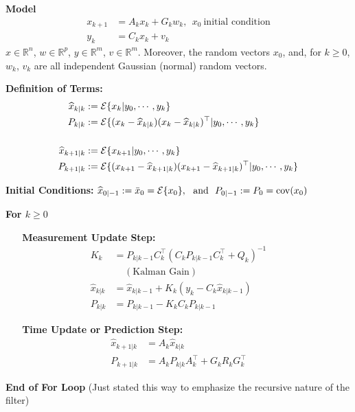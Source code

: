\documentclass[letterpaper]{article}
\newcommand{\real}{\mathbb R}  %
\newcommand{\cov}{\mathrm{cov}}
\newcommand{\Expectof}[1]{{\cal E} \{ #1 \}}
\newcommand{\ExpectofGiven}[2]{{\cal E} \{ #1 | #2 \}}
\begin{document}
\baselineskip=48pt  %


\setlength{\parskip}{.3in}
\setlength{\itemsep}{.3in}

\pagestyle{plain}



\Large

\noindent \textbf{Model}~
\begin{align*}
x_{k+1} &= A_k x_k + G_k w_k,~~x_0~\text{initial condition}\\
y_k &= C_k x_k + v_k
\end{align*}
$x\in \real^n$, $w \in \real^p$, $y\in \real^m$, $v\in \real^m$. Moreover, the random vectors
$x_0$, and, for $k\ge 0$,  $w_k$, $v_k$ are all independent Gaussian (normal) random vectors.


\textbf{Definition of Terms:}
\begin{align*}
\widehat{x}_{k|k} &:= \ExpectofGiven{x_k}{y_0, \cdots, y_k}\\
P_{k|k} &:=\ExpectofGiven{(x_k-\widehat{x}_{k|k})(x_k-\widehat{x}_{k|k})^\top}{y_0, \cdots, y_k}\\
& \\
\widehat{x}_{k+1|k} &:= \ExpectofGiven{ x_{k+1} }{ y_0, \cdots, y_k}\\
P_{k+1|k}&:= \ExpectofGiven{(x_{k+1}-\widehat{x}_{k+1|k})(x_{k+1}-\widehat{x}_{k+1|k})^\top}{y_0, \cdots, y_k}\\
\end{align*}
\vspace*{-1cm}

\textbf{Initial Conditions:} $\widehat{x}_{0|-1} :=\bar{x}_0 = \Expectof{x_0},~~\mbox{and}~~P_{0|-1}:=P_0=\cov(x_0)  $

\textbf{For $k \ge 0$}

\textbf{~~~Measurement Update Step:}
\begin{align*}
K_k &= P_{k|k-1}C_k^\top \left(C_k P_{k|k-1} C_k^\top + Q_k\right)^{-1} \\
& ~~~~~(\text{Kalman Gain})\\
\widehat{x}_{k|k} &= \widehat{x}_{k|k-1}  + K_k \left( y_k - C_k \widehat{x}_{k|k-1} \right) \\
P_{k|k} &= P_{k|k-1} - K_k C_k  P_{k|k-1}
\end{align*}

\textbf{~~~Time Update or Prediction Step:}
\begin{align*}
\widehat{x}_{k+1|k} &= A_k \widehat{x}_{k|k}  \\
P_{k+1|k} &= A_k P_{k|k} A_k^\top + G_k R_k G_k^\top
\end{align*}

\textbf{End of For Loop} (Just stated this way to emphasize the recursive nature of the filter)
\end{document}
